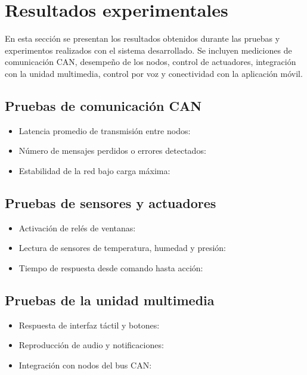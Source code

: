 \section{Resultados experimentales}

En esta sección se presentan los resultados obtenidos durante las pruebas y experimentos realizados con el sistema desarrollado. Se incluyen mediciones de comunicación CAN, desempeño de los nodos, control de actuadores, integración con la unidad multimedia, control por voz y conectividad con la aplicación móvil.

\subsection{Pruebas de comunicación CAN}

\begin{itemize}
    \item Latencia promedio de transmisión entre nodos: \underline{\hspace{3cm}}
    \item Número de mensajes perdidos o errores detectados: \underline{\hspace{3cm}}
    \item Estabilidad de la red bajo carga máxima: \underline{\hspace{3cm}}
\end{itemize}

\subsection{Pruebas de sensores y actuadores}

\begin{itemize}
    \item Activación de relés de ventanas: \underline{\hspace{3cm}}
    \item Lectura de sensores de temperatura, humedad y presión: \underline{\hspace{3cm}}
    \item Tiempo de respuesta desde comando hasta acción: \underline{\hspace{3cm}}
\end{itemize}

\subsection{Pruebas de la unidad multimedia}

\begin{itemize}
    \item Respuesta de interfaz táctil y botones: \underline{\hspace{3cm}}
    \item Reproducción de audio y notificaciones: \underline{\hspace{3cm}}
    \item Integración con nodos del bus CAN: \underline{\hspace{3cm}}
\end{itemize}

